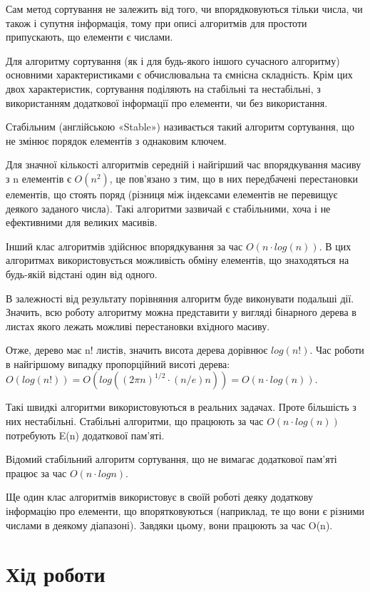 \documentclass{article}
\begin{document}
\begin{normalsize}
		Сам метод сортування не залежить від того, чи впорядковуються тільки числа, чи також і супутня інформація, тому при описі алгоритмів для простоти припускають, що елементи є числами.
		
		Для алгоритму сортування (як і для будь-якого іншого сучасного алгоритму) основними характеристиками є обчислювальна та ємнісна складність. Крім цих двох характеристик, сортування поділяють на стабільні та нестабільні, з використанням додаткової інформації про елементи, чи без використання.
		
		Стабільним (англійською «Stable») називається такий алгоритм сортування, що не змінює порядок елементів з однаковим ключем.
		
		Для значної кількості алгоритмів середній і найгірший час впорядкування масиву з n елементів є $O(n^2)$, це пов’язано з тим, що в них передбачені перестановки елементів, що стоять поряд (різниця між індексами елементів не перевищує деякого заданого числа). Такі алгоритми зазвичай є стабільними, хоча і не ефективними для великих масивів.
		
		Інший клас алгоритмів здійснює впорядкування за час $O(n \cdot log(n))$. В цих алгоритмах використовується можливість обміну елементів, що знаходяться на будь-якій відстані один від одного.
		
		В залежності від результату порівняння алгоритм буде виконувати подальші дії. Значить, всю роботу алгоритму можна представити у вигляді бінарного дерева в листах якого лежать можливі перестановки вхідного масиву.
		
		Отже, дерево має n! листів, значить висота дерева дорівнює $log(n!)$. Час роботи в найгіршому випадку пропорційний висоті дерева:$O(log(n!)) = O(log((2\pi n)^{1/2} \cdot (n/e)n)) = O(n \cdot log(n))$.
		
		Такі швидкі алгоритми використовуються в реальних задачах. Проте більшість з них нестабільні. Стабільні алгоритми, що працюють за час $O(n \cdot log(n))$ потребують E(n) додаткової пам’яті.
		
		Відомий стабільний алгоритм сортування, що не вимагає додаткової пам’яті працює за час $O(n \cdot log n)$.
		
		Ще один клас алгоритмів використовує в своїй роботі деяку додаткову інформацію про елементи, що впорятковуються (наприклад, те що вони є різними числами в деякому діапазоні). Завдяки цьому, вони працюють за час O(n).
		
		\section*{Хід роботи}
		\begin{multicols}{2}
		

\end{multicols}
\end{normalsize}
\end{document}
